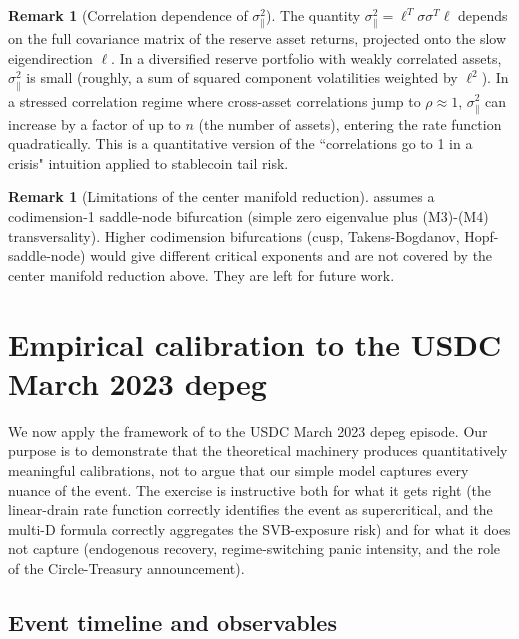 \documentclass[11pt,a4paper]{article}
\theoremstyle{plain}
\theoremstyle{definition}
\newtheorem{remark}[theorem]{Remark}
\begin{document}
\begin{remark}[Correlation dependence of $\sigma_\|^2$]
The quantity $\sigma_\|^2 = \ell^T \sigma\sigma^T\ell$ depends on the full covariance matrix of the reserve asset returns, projected onto the slow eigendirection $\ell$. In a diversified reserve portfolio with weakly correlated assets, $\sigma_\|^2$ is small (roughly, a sum of squared component volatilities weighted by $\ell^2$). In a stressed correlation regime where cross-asset correlations jump to $\rho \approx 1$, $\sigma_\|^2$ can increase by a factor of up to $n$ (the number of assets), entering the rate function quadratically. This is a quantitative version of the ``correlations go to 1 in a crisis" intuition applied to stablecoin tail risk.
\end{remark}

\begin{remark}[Limitations of the center manifold reduction]
 assumes a codimension-1 saddle-node bifurcation (simple zero eigenvalue plus (M3)-(M4) transversality). Higher codimension bifurcations (cusp, Takens-Bogdanov, Hopf-saddle-node) would give different critical exponents and are not covered by the center manifold reduction above. They are left for future work.
\end{remark}

\section{Empirical calibration to the USDC March 2023 depeg}
\label{sec:empirical}

We now apply the framework of  to the USDC March 2023 depeg episode.
Our purpose is to demonstrate that the theoretical machinery produces quantitatively meaningful calibrations, not to argue that our simple model captures every nuance of the event.
The exercise is instructive both for what it gets right (the linear-drain rate function correctly identifies the event as supercritical, and the multi-D formula correctly aggregates the SVB-exposure risk) and for what it does not capture (endogenous recovery, regime-switching panic intensity, and the role of the Circle-Treasury announcement).

\subsection{Event timeline and observables}
\end{document}
